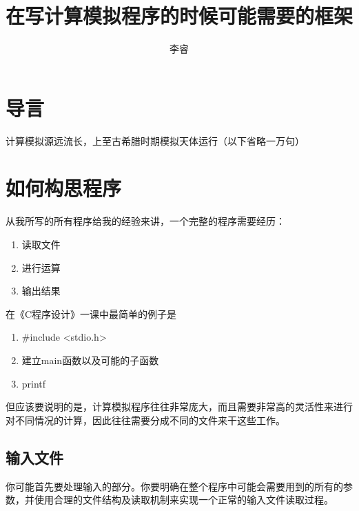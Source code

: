 \documentclass[12pt,a4paper]{article}
\title{在写计算模拟程序的时候可能需要的框架}
\author{李睿}
\begin{document}
\maketitle

\section{导言}
计算模拟源远流长，上至古希腊时期模拟天体运行（以下省略一万句）

\section{如何构思程序}
从我所写的所有程序给我的经验来讲，一个完整的程序需要经历：
\begin{enumerate}
	\item 读取文件
	\item 进行运算
	\item 输出结果
\end{enumerate}
在《C程序设计》一课中最简单的例子是
\begin{enumerate}
	\item \#include <stdio.h>
	\item 建立main函数以及可能的子函数
	\item printf
\end{enumerate}
但应该要说明的是，计算模拟程序往往非常庞大，而且需要非常高的灵活性来进行对不同情况的计算，因此往往需要分成不同的文件来干这些工作。

\subsection{输入文件}
你可能首先要处理输入的部分。你要明确在整个程序中可能会需要用到的所有的参数，并使用合理的文件结构及读取机制来实现一个正常的输入文件读取过程。
\end{document}
